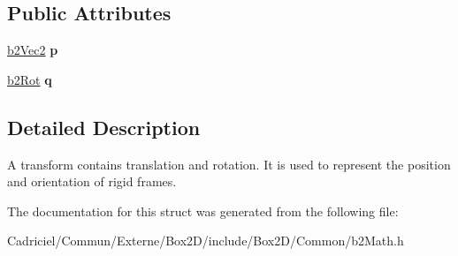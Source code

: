 \subsection*{Public Attributes}
\begin{DoxyCompactItemize}
\item 
\hyperlink{structb2_vec2}{b2\+Vec2} {\bfseries p}\hypertarget{structb2_transform_a9eeeb643a016c29a4d389e480ba6c628}{}\label{structb2_transform_a9eeeb643a016c29a4d389e480ba6c628}

\item 
\hyperlink{structb2_rot}{b2\+Rot} {\bfseries q}\hypertarget{structb2_transform_ae4aaac23f32686e165138c4e5dc4ce85}{}\label{structb2_transform_ae4aaac23f32686e165138c4e5dc4ce85}

\end{DoxyCompactItemize}


\subsection{Detailed Description}
A transform contains translation and rotation. It is used to represent the position and orientation of rigid frames. 

The documentation for this struct was generated from the following file\+:\begin{DoxyCompactItemize}
\item 
Cadriciel/\+Commun/\+Externe/\+Box2\+D/include/\+Box2\+D/\+Common/b2\+Math.\+h\end{DoxyCompactItemize}
